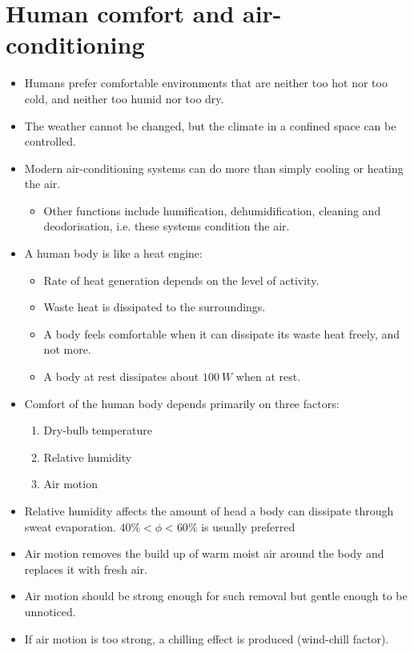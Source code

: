 \documentclass[11pt]{article}
\begin{document}
 \newpage

\section{Human comfort and air-conditioning}
\label{sec:org9a9d68f}
\begin{itemize}
\item Humans prefer comfortable environments that are neither too hot nor too cold, and neither too humid nor too dry.
\item The weather cannot be changed, but the climate in a confined space can be controlled.
\item Modern air-conditioning systems can do more than simply cooling or heating the air.
\begin{itemize}
\item Other functions include humification, dehumidification, cleaning and deodorisation, i.e. these systems condition the air.
\end{itemize}
\item A human body is like a heat engine:
\begin{itemize}
\item Rate of heat generation depends on the level of activity.
\item Waste heat is dissipated to the surroundings.
\item A body feels comfortable when it can dissipate its waste heat freely, and not more.
\item A body at rest dissipates about \(\qty{100}{W}\) when at rest.
\end{itemize}
\item Comfort of the human body depends primarily on three factors:
\begin{enumerate}
\item Dry-bulb temperature
\item Relative humidity
\item Air motion
\end{enumerate}
\item Relative humidity affects the amount of head a body can dissipate through sweat evaporation. \(40\% < \phi < 60\%\) is usually preferred
\item Air motion removes the build up of warm moist air around the body and replaces it with fresh air.
\item Air motion should be strong enough for such removal but gentle enough to be unnoticed.
\item If air motion is too strong, a chilling effect is produced (wind-chill factor).
\end{itemize}
\end{document}
